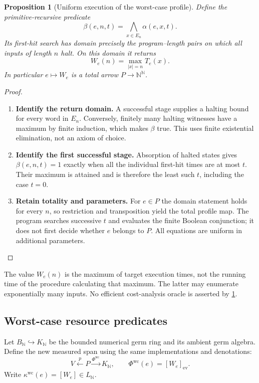\documentclass[11pt,a4paper]{article}
\numberwithin{algorithm}{section}
\numberwithin{equation}{section}
\newtheorem{proposition}[proposition]{Proposition}
\theoremstyle{definition}
\theoremstyle{remark}
\theoremstyle{plain}
\newcommand{\N}{\mathbb N}
\newcommand{\incl}{\hookrightarrow}
\theoremstyle{definition}
\theoremstyle{plain}
\begin{document}
\begin{proposition}[Uniform execution of the worst-case profile]
\label{prop:wc-profile-clock}
Define the primitive-recursive predicate
\[
 \beta(e,n,t)=\bigwedge_{x\in E_n}\alpha(e,x,t).
\]
Its first-hit search has domain precisely the program--length pairs on
which all inputs of length $n$ halt. On this domain it returns
\[
 W_e(n)=\max_{|x|=n}T_e(x).
\]
In particular $e\mapsto W_e$ is a total arrow $P\to\N^\N$.
\end{proposition}
\begin{proof}\leavevmode
\begin{enumerate}[leftmargin=*,align=left]
\item \textbf{Identify the return domain.}
A successful stage supplies a halting bound for every word in $E_n$.
Conversely, finitely many halting witnesses have a maximum by finite
induction, which makes $\beta$ true. This uses finite existential
elimination, not an axiom of choice.
\item \textbf{Identify the first successful stage.}
Absorption of halted states gives
$\beta(e,n,t)=1$ exactly when all the individual first-hit times are at
most $t$. Their maximum is attained and is therefore the least such
$t$, including the case $t=0$.
\item \textbf{Retain totality and parameters.}
For $e\in P$ the domain statement holds for every $n$, so restriction
and transposition yield the total profile map. The program searches
successive $t$ and evaluates the finite Boolean conjunction; it does
not first decide whether $e$ belongs to $P$. All equations are uniform
in additional parameters.
\end{enumerate}
\end{proof}

The value $W_e(n)$ is the maximum of target execution times, not the
running time of the procedure calculating that maximum. The latter may
enumerate exponentially many inputs. No efficient cost-analysis oracle
is asserted by \cref{prop:wc-profile-clock}.


\subsection{Worst-case resource predicates}

Let $B_\N\incl K_\N$ be the bounded numerical germ ring and its
ambient germ algebra. Define the new measured span using the same
implementations and denotations:
\[
 V\xleftarrow{p}P\xrightarrow{\Phi^{\mathrm{wc}}}K_\N,
 \qquad \Phi^{\mathrm{wc}}(e)=[W_e]_{\mathrm{ev}}.
\]
Write $\kappa^{\mathrm{wc}}(e)=[W_e]\in L_\N$.
\end{document}
